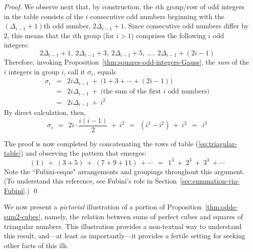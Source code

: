 \begin{proof}
We observe next that, by construction, the $i$th group/row of odd integers in the table consists of the
$i$ consecutive odd numbers beginning with the $\left( \Delta_{i-1} +1 \right)$th odd number,
$2 \Delta_{i-1} +1$.  Since consecutive odd numbers differ by $2$, this means that the $i$th
group (for $i>1$) comprises the following $i$ odd integers:
\[
2 \Delta_{i-1} +1, \ 2 \Delta_{i-1}  +3, \ 2 \Delta_{i-1}  +5 , \
\ldots, \ 2 \Delta_{i-1} + (2i-1)
\]
Therefore, invoking Proposition~\ref{thm:squares-odd-integers-Gauss},
the {\em sum} of the $i$ integers in group $i$, call it $\sigma_i$, equals
\begin{eqnarray*}
\sigma_i & = &
2 i \Delta_{i-1} \ + \ \big( 1 + 3 + \cdots + (2i-1) \big) \\
   & = & 2 i \Delta_{i-1} \ + \ \mbox{(the sum of the first $i$ odd numbers)} \\
   & = & 2 i \Delta_{i-1} \ + \ i^2
\end{eqnarray*}
By direct calculation, then, 
\[ \sigma_i \ \ = \ \
2i  \cdot \frac{i(i-1)}{2} \ + \ i^2 \ \ = \ \
(i^3 - i^2)  \ + \ i^2 \ \ = \ \ i^3
\]

\noindent
The proof is now completed by concatenating the rows of table (\ref{eq:triagular-table}) and
observing the pattern that emerges:
\[ (1) \ + \ (3 + 5) \ + \ (7 + 9 + 11) \  + \cdots
\ \ = \ \ 1^3 \ + \ 2^3 \ + \ 3^3 \ + \cdots 
\]
Note the ``Fubini-esque" arrangements and groupings throughout this argument. (To
understand this reference, see Fubini's role in Section~\ref{sec:summation-via-Fubini}.)  \qed
\end{proof}


We now present a {\em pictorial} illustration of a portion of Proposition~\ref{thm:odds-sum2-cubes},
namely, the relation between sums of perfect cubes  and squares of triangular numbers.
This illustration provides a non-textual way to understand this result, and---at least
as importantly---it provides a fertile setting for seeking other facts of this ilk.

